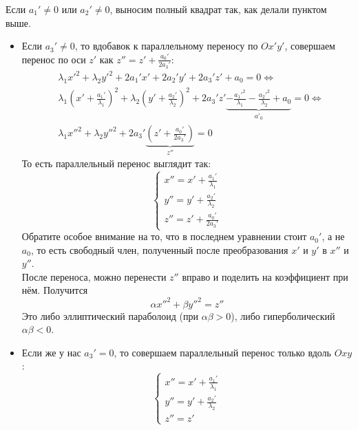 \documentclass{article}
\begin{document}
\begin{itemize}
\begin{Comment}
\begin{itemize}
                Если $a_1'\neq0$ или $a_2'\neq0$, выносим полный квадрат так, как делали пунктом выше.
                \begin{itemize}
                    \item Если $a_3'\neq0$, то вдобавок к параллельному переносу по $Ox'y'$, совершаем перенос по оси $z'$ как $z''=z'+\frac{a_0'}{2a_3'}$:
                    \[\begin{split}
                        &\lambda_1{x'}^2+\lambda_2{y'}^2+2a_1'x'+2a_2'y'+2a_3'z'+a_0=0\Leftrightarrow\\
                        &\lambda_1\left(x'+\frac{a_1'}{\lambda_1}\right)^2+\lambda_2\left(y'+\frac{a_2'}{\lambda_2}\right)^2+2a_3'z'\underbrace{-\frac{{a_1'}^2}{\lambda_1}-\frac{{a_2'}^2}{\lambda_2}+a_0}_{a'_0}=0\Leftrightarrow\\
                        &\lambda_1{x''}^2+\lambda_2{y''}^2+2a_3'\underbrace{\left(z'+\frac{a_0'}{2a_3'}\right)}_{z''}=0
                    \end{split}\]
                    То есть параллельный перенос выглядит так:
                    $$
                    \left\{\begin{aligned}
                        x''=x'+\frac{a_1'}{\lambda_1}\\
                        y''=y'+\frac{a_2'}{\lambda_2}\\
                        z''=z'+\frac{a_0'}{2a_3'}
                    \end{aligned}\right.
                    $$
                    Обратите особое внимание на то, что в последнем уравнении стоит $a_0'$, а не $a_0$, то есть свободный член, полученный после преобразования $x'$ и $y'$ в $x''$ и $y''$.\\
                    После переноса, можно перенести $z''$ вправо и поделить на коэффициент при нём. Получится
                    $$
                    \alpha{x''}^2+\beta{y''}^2=z''
                    $$
                    Это либо эллиптический параболоид (при $\alpha\beta>0$), либо гиперболический $\alpha\beta<0$.
                    \item Если же у нас $a_3'=0$, то совершаем параллельный перенос только вдоль $Oxy$:
                    $$
                    \left\{\begin{aligned}
                        x''=x'+\frac{a_1'}{\lambda_1}\\
                        y''=y'+\frac{a_2'}{\lambda_2}\\
                        z''=z'
                    \end{aligned}\right.
$$
\end{itemize}
\end{itemize}
\end{Comment}
\end{itemize}
\end{document}
